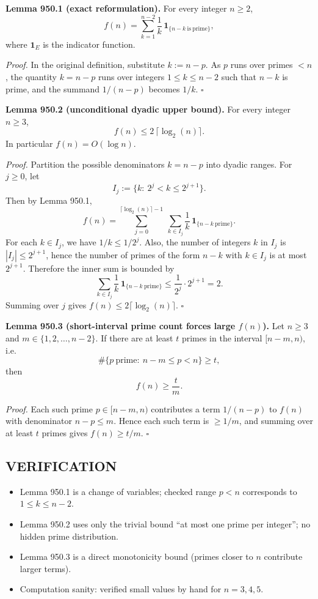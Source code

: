 \medskip
\noindent\textbf{Lemma 950.1 (exact reformulation).}
For every integer $n\ge 2$,
\[
f(n)=\sum_{k=1}^{n-2}\frac{1}{k}\,\mathbf 1_{\{n-k\ \mathrm{is\ prime}\}},
\]
where $\mathbf 1_E$ is the indicator function.

\medskip
\noindent\emph{Proof.}
In the original definition, substitute $k:=n-p$.
As $p$ runs over primes $<n$, the quantity $k=n-p$ runs over integers $1\le k\le n-2$ such that $n-k$ is prime, and the summand $1/(n-p)$ becomes $1/k$.
\hfill $\square$

\medskip
\noindent\textbf{Lemma 950.2 (unconditional dyadic upper bound).}
For every integer $n\ge 3$,
\[
f(n)\le 2\,\lceil \log_2(n)\rceil.
\]
In particular $f(n)=O(\log n)$.

\medskip
\noindent\emph{Proof.}
Partition the possible denominators $k=n-p$ into dyadic ranges.
For $j\ge 0$, let
\[
I_j:=\{k:\ 2^j<k\le 2^{j+1}\}.
\]
Then by Lemma 950.1,
\[
f(n)=\sum_{j=0}^{\lceil\log_2(n)\rceil-1}\ \sum_{k\in I_j}\frac{1}{k}\,\mathbf 1_{\{n-k\ \mathrm{prime}\}}.
\]
For each $k\in I_j$, we have $1/k\le 1/2^j$.
Also, the number of integers $k$ in $I_j$ is $|I_j|\le 2^{j+1}$, hence the number of primes of the form $n-k$ with $k\in I_j$ is at most $2^{j+1}$.
Therefore the inner sum is bounded by
\[
\sum_{k\in I_j}\frac{1}{k}\,\mathbf 1_{\{n-k\ \mathrm{prime}\}}\le \frac{1}{2^j}\cdot 2^{j+1}=2.
\]
Summing over $j$ gives $f(n)\le 2\lceil\log_2(n)\rceil$.
\hfill $\square$

\medskip
\noindent\textbf{Lemma 950.3 (short-interval prime count forces large $f(n)$).}
Let $n\ge 3$ and $m\in\{1,2,\dots,n-2\}$.
If there are at least $t$ primes in the interval $[n-m,n)$, i.e.
\[
\#\{p\ \text{prime}:\ n-m\le p<n\}\ge t,
\]
then
\[
f(n)\ge \frac{t}{m}.
\]

\medskip
\noindent\emph{Proof.}
Each such prime $p\in[n-m,n)$ contributes a term $1/(n-p)$ to $f(n)$ with denominator $n-p\le m$.
Hence each such term is $\ge 1/m$, and summing over at least $t$ primes gives $f(n)\ge t/m$.
\hfill $\square$

\subsection*{VERIFICATION}
\begin{itemize}
\item Lemma 950.1 is a change of variables; checked range $p<n$ corresponds to $1\le k\le n-2$.
\item Lemma 950.2 uses only the trivial bound ``at most one prime per integer''; no hidden prime distribution.
\item Lemma 950.3 is a direct monotonicity bound (primes closer to $n$ contribute larger terms).
\item Computation sanity: verified small values by hand for $n=3,4,5$.
\end{itemize}

